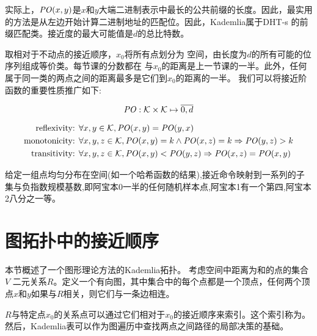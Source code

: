 实际上，$\mathit{PO}(x,y)$是$x$和$y$大端二进制表示中最长的公共前缀的长度。因此，最实用的方法是从左边开始计算二进制地址的匹配位。因此，Kademlia属于DHT-s \cite{rowstron2001pastry,zhao2004tapestry}的前缀匹配类。接近度的最大可能值是$d$的总比特数。 

取相对于不动点的接近顺序，$x_0$将所有点划分为
空间，由长度为$d$的所有可能的位序列组成等价类。每节课的分数都在
与$x_0$的距离是上一节课的一半。此外，任何属于同一类的两点之间的距离最多是它们到$x_0$的距离的一半。 
我们可以将接近阶函数的重要性质推广如下:

\begin{definition}\label{def:PO}
\begin{equation}
\mathit{PO}: \mathcal{K}\times \mathcal{K}\mapsto \overline{0,d}
\end{equation}

\begin{subequations}
  \begin{align}
    \label{eq:PO-constraint-symmetry} \text{reflexivity:  }&\forall x,y\in \mathcal{K}, \mathit{PO}(x,y)=\mathit{PO}(y,x)\\
    \label{eq:PO-constraint-monotonicity}\text{monotonicity:   }&\forall x,y,z\in \mathcal{K}, \mathit{PO}(x,y)=k \land  \mathit{PO}(x,z)=k \Rightarrow  \mathit{PO}(y,z)>k\\
\label{eq:PO-constraint-transitivity}\text{transitivity:   }&\forall x,y,z\in \mathcal{K}, \mathit{PO}(x,y)<\mathit{PO}(y,z) \Rightarrow \mathit{PO}(x,z)=\mathit{PO}(x,y)
   \end{align}
\end{subequations}
\end{definition}

给定一组点均匀分布在空间(如一个哈希函数的结果),接近命令映射到一系列的子集与负指数规模基数,即阿宝本$0$一半的任何随机样本点,阿宝本1有一个第四,阿宝本2八分之一等。

\section{图拓扑中的接近顺序\statusgreen}

本节概述了一个图形理论方法的Kademlia拓扑\cite{aspnes2007skip}。
考虑空间中距离为和的点的集合$V$ 
二元关系$R$。定义一个有向图，其中集合中的每个点都是一个顶点，任何两个顶点$x$和$y$如果与$R$相关，则它们与一条边相连。 


$R$与特定点$x_0$的关系点可以通过它们相对于$x_0$的接近顺序来索引。这个索引称为。
然后，Kademlia表可以作为图遍历中查找两点之间路径的局部决策的基础。 


